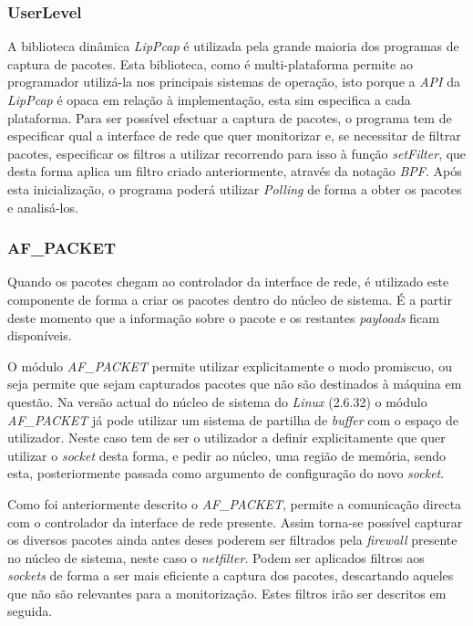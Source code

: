 \subsubsection{UserLevel}

A biblioteca dinâmica \textit{LipPcap} é utilizada pela grande maioria dos programas de captura de pacotes. Esta biblioteca, como é multi-plataforma permite ao programador utilizá-la nos principais sistemas de operação, isto porque a \textit{API} da \textit{LipPcap} é opaca em relação à implementação, esta sim especifica a cada plataforma. 
Para ser possível efectuar a captura de pacotes, o programa tem de especificar qual a interface de rede que quer monitorizar e, se necessitar de filtrar pacotes, especificar os filtros a utilizar recorrendo para isso à função \textit{setFilter}, que desta forma aplica um filtro criado anteriormente, através da notação \textit{BPF}. Após esta inicialização, o programa poderá utilizar \textit{Polling} de forma a obter os pacotes e analisá-los.

\subsubsection{AF\_PACKET}

Quando os pacotes chegam ao controlador da interface de rede, é utilizado este componente de forma a criar os pacotes dentro do núcleo de sistema. É a partir deste momento que a informação sobre o pacote e os restantes \textit{payloads} ficam disponíveis.

O módulo \textit{AF\_PACKET} permite utilizar explicitamente o modo promiscuo, ou seja permite que sejam capturados pacotes que não são destinados à máquina em questão.
Na versão actual do núcleo de sistema do \textit{Linux} (2.6.32) o módulo \textit{AF\_PACKET} já pode utilizar um sistema de partilha de \textit{buffer} com o espaço de utilizador. Neste caso tem de ser o utilizador a definir explicitamente que quer utilizar o \textit{socket} desta forma, e pedir ao núcleo, uma região de memória, sendo esta, posteriormente passada como argumento de configuração do novo \textit{socket}.

Como foi anteriormente descrito o \textit{AF\_PACKET}, permite a comunicação directa com o controlador da interface de rede presente. Assim torna-se possível capturar os diversos pacotes ainda antes deses poderem ser filtrados pela \textit{firewall} presente no núcleo de sistema, neste caso o \textit{netfilter}.
Podem ser aplicados filtros aos \textit{sockets} de forma a ser mais eficiente a captura dos pacotes, descartando aqueles que não são relevantes para a monitorização. Estes filtros irão ser descritos em seguida.


